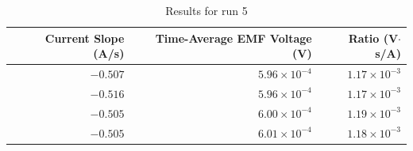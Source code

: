 %
\begin{table}[ht]
	\centering
	\begin{tabular}{|r|r|r|}
		\hline
		Current Slope (A/s) & Time-Average EMF Voltage (V) & Ratio (V$\cdot$s/A) \\
		\hline
		$-0.507$ & $5.96 \times 10^{-4}$ & $1.17 \times 10^{-3}$ \\
		$-0.516$ & $5.96 \times 10^{-4}$ & $1.17 \times 10^{-3}$ \\
		$-0.505$ & $6.00 \times 10^{-4}$ & $1.19 \times 10^{-3}$ \\
		$-0.505$ & $6.01 \times 10^{-4}$ & $1.18 \times 10^{-3}$ \\
		\hline
	\end{tabular}
	\caption{Results for run 5}
	\label{table.04.run.5}
\end{table}
%
\FloatBarrier
\newpage
